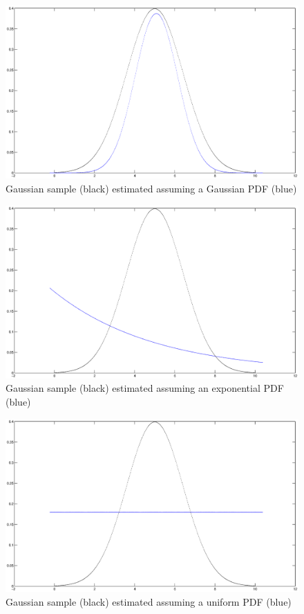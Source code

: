 \begin{figure}
\includegraphics[scale=0.4]{gauss-gauss}
\caption{Gaussian sample (black) estimated assuming a Gaussian PDF (blue)}
\label{fig:gg}
\end{figure}

\begin{figure}
\includegraphics[scale=0.4]{gauss-exp}
\caption{Gaussian sample (black) estimated assuming an exponential PDF (blue)}
\label{fig:ge}
\end{figure}

\begin{figure}
\includegraphics[scale=0.4]{gauss-uni}
\caption{Gaussian sample (black) estimated assuming a uniform PDF (blue)}
\label{fig:gu}
\end{figure}

